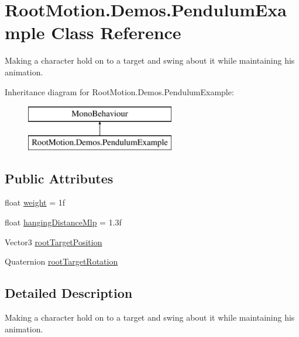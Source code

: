 \hypertarget{class_root_motion_1_1_demos_1_1_pendulum_example}{}\section{Root\+Motion.\+Demos.\+Pendulum\+Example Class Reference}
\label{class_root_motion_1_1_demos_1_1_pendulum_example}


Making a character hold on to a target and swing about it while maintaining his animation.  


Inheritance diagram for Root\+Motion.\+Demos.\+Pendulum\+Example\+:\begin{figure}[H]
\begin{center}
\leavevmode
\includegraphics[height=2.000000cm]{class_root_motion_1_1_demos_1_1_pendulum_example}
\end{center}
\end{figure}
\subsection*{Public Attributes}
\begin{DoxyCompactItemize}
\item 
float \mbox{\hyperlink{class_root_motion_1_1_demos_1_1_pendulum_example_ac6c90130723c1e95b19a8c946d5c950c}{weight}} = 1f
\item 
float \mbox{\hyperlink{class_root_motion_1_1_demos_1_1_pendulum_example_a32af110b0b4744dc4066fab468b15cb2}{hanging\+Distance\+Mlp}} = 1.\+3f
\item 
Vector3 \mbox{\hyperlink{class_root_motion_1_1_demos_1_1_pendulum_example_ac55c1166dea624a772e45ab70670fdc3}{root\+Target\+Position}}
\item 
Quaternion \mbox{\hyperlink{class_root_motion_1_1_demos_1_1_pendulum_example_abbfc34836e29a407768d134e47a6d24f}{root\+Target\+Rotation}}
\end{DoxyCompactItemize}


\subsection{Detailed Description}
Making a character hold on to a target and swing about it while maintaining his animation. 



